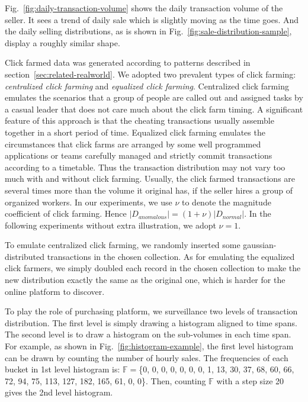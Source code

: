 \documentclass[10pt,conference,letterpaper]{IEEEtran}
\begin{document}
			Fig.~\ref{fig:daily-transaction-volume} shows the daily transaction volume of the seller. It sees a trend of daily sale which is slightly moving as the time goes. And the daily selling distributions, as is shown in Fig.~\ref{fig:sale-distribution-sample}, display a roughly similar shape.
			
			Click farmed data was generated according to patterns described in section~\ref{sec:related-realworld}. We adopted two prevalent types of click farming: \textit{centralized click farming} and \textit{equalized click farming}. Centralized click farming emulates the scenarios that a group of people are called out and assigned tasks by a casual leader that does not care much about the click farm timing. A significant feature of this approach is that the cheating transactions usually assemble together in a short period of time. Equalized click farming emulates the circumstances that click farms are arranged by some well programmed applications or teams carefully managed and strictly commit transactions according to a timetable. Thus the transaction distribution may not vary too much with and without click farming. Usually, the click farmed transactions are several times more than the volume it original has, if the seller hires a group of organized workers. In our experiments, we use $\nu$ to denote the magnitude coefficient of click farming. Hence $|D_{anomalous}| = (1 + \nu)|D_{normal}|$. In the following experiments without extra illustration, we adopt $\nu = 1$.
	
			To emulate centralized click farming, we randomly inserted some gaussian-distributed transactions in the chosen collection. As for emulating the equalized click farmers, we simply doubled each record in the chosen collection to make the new distribution exactly the same as the original one, which is harder for the online platform to discover.
			
			To play the role of purchasing platform, we surveillance two levels of transaction distribution. The first level is simply drawing a histogram aligned to time spans. The second level is to draw a histogram on the sub-volumes in each time span. For example, as shown in Fig.~\ref{fig:histogram-example}, the first level histogram can be drawn by counting the number of hourly sales. The frequencies of each bucket in 1st level histogram is: $\mathbb{F}=$\{0, 0, 0, 0, 0, 0, 0, 1, 13, 30, 37, 68, 60, 66, 72, 94, 75, 113, 127, 182, 165, 61, 0, 0\}. Then, counting $\mathbb{F}$ with a step size 20 gives the 2nd level histogram.
	
\end{document}
